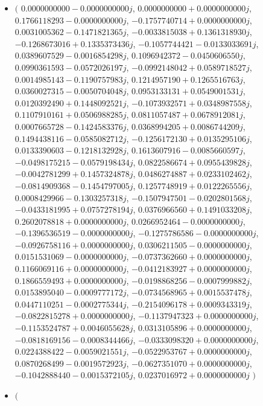 \documentclass[14pt,a4paper]{article}
\begin{document}
\begin{itemize}
\item
$\big($
$0.0000000000-0.0000000000j$, $0.0000000000+0.0000000000j$, $0.1766118293-0.0000000000j$, $-0.1757740714+0.0000000000j$, $0.0031005362-0.1471821365j$, $-0.0033815038+0.1361318930j$, $-0.1268673016+0.1335373436j$, $-0.1057744421-0.0133033691j$, $0.0389607529-0.0016854298j$, $0.1096942372-0.0450606550j$, $0.0990361593-0.0572026197j$, $-0.0992148042+0.0589718527j$, $0.0014985143-0.1190757983j$, $0.1214957190+0.1265516763j$, $0.0360027315-0.0050704048j$, $0.0953133131+0.0549001531j$, $0.0120392490+0.1448092521j$, $-0.1073932571+0.0348987558j$, $0.1107910161+0.0506988285j$, $0.0811057487+0.0678912081j$, $0.0007665728-0.1424583376j$, $0.0368994205+0.0086744209j$, $0.1494438116-0.0585082712j$, $-0.1256172130+0.0135295106j$, $0.0133390603-0.1218132928j$, $0.1613607916-0.0085660597j$, $-0.0498175215-0.0579198434j$, $0.0822586674+0.0955439828j$, $-0.0042781299+0.1457324878j$, $0.0486274887+0.0233102462j$, $-0.0814909368-0.1454797005j$, $0.1257748919+0.0122265556j$, $0.0008429966-0.1303257318j$, $-0.1507947501-0.0202801568j$, $-0.0433181995+0.0757278194j$, $0.0376966560+0.1491033208j$, $0.2602078818+0.0000000000j$, $0.0266952464-0.0000000000j$, $-0.1396536519-0.0000000000j$, $-0.1275786586-0.0000000000j$, $-0.0926758116+0.0000000000j$, $0.0306211505-0.0000000000j$, $0.0151531069-0.0000000000j$, $-0.0737362660+0.0000000000j$, $0.1166069116+0.0000000000j$, $-0.0412183927+0.0000000000j$, $0.1866559493+0.0000000000j$, $-0.0198868256-0.0007999882j$, $0.0153895040-0.0009777172j$, $-0.0734568965+0.0015537478j$, $0.0447110251-0.0002775344j$, $-0.2154096178+0.0009343319j$, $-0.0822815278+0.0000000000j$, $-0.1137947323+0.0000000000j$, $-0.1153524787+0.0046055628j$, $0.0313105896+0.0000000000j$, $-0.0818169156-0.0008344466j$, $-0.0333098320+0.0000000000j$, $0.0224388422-0.0059021551j$, $-0.0522953767+0.0000000000j$, $0.0870268499-0.0019572923j$, $-0.0627351070+0.0000000000j$, $-0.1042888440-0.0015372105j$, $0.0237016972+0.0000000000j$
$\big)$
\item
$\big($

\end{itemize}
\end{document}
